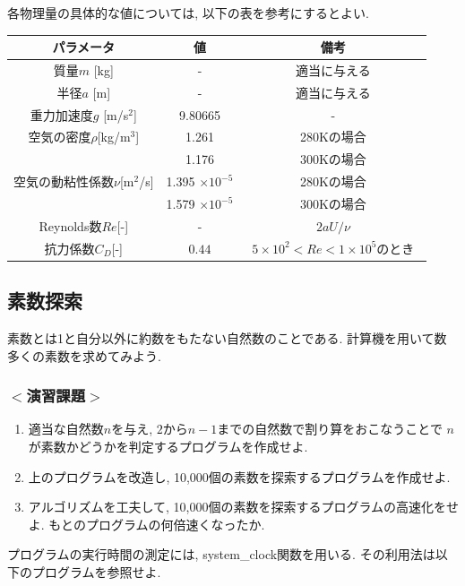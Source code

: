 \documentclass[a4j]{jsarticle}
\begin{document}
各物理量の具体的な値については, 以下の表を参考にするとよい. 
\begin{table}[h]
\centering
\begin{tabular}{ccc}
\hline
パラメータ & 値 & 備考 \\
\hline
質量$m$ [kg] & - & 適当に与える \\ \hline
半径$a$ [m] & - & 適当に与える \\ \hline
重力加速度$g$ [m/s$^2$] & 9.80665 & - \\ \hline
空気の密度$\rho$[kg/m$^3$] & 1.261 & 280Kの場合 \\
 & 1.176 & 300Kの場合 \\ \hline
空気の動粘性係数$\nu$[m$^2$/s] & 1.395 $\times 10^{-5}$ & 280Kの場合 \\
 & 1.579 $\times 10^{-5}$ & 300Kの場合 \\ \hline
Reynolds数$Re$[-] & - & $2aU/\nu$ \\ \hline
抗力係数$C_D$[-] & $0.44$ & $5 \times 10^2 < Re < 1 \times 10^5$のとき　\\ \hline
\end{tabular}
\end{table}



\subsection{素数探索}
素数とは1と自分以外に約数をもたない自然数のことである. 
計算機を用いて数多くの素数を求めてみよう. 

\subsubsection*{$<$演習課題$>$}
\begin{enumerate}
\item 適当な自然数$n$を与え, $2$から$n-1$までの自然数で割り算をおこなうことで
$n$が素数かどうかを判定するプログラムを作成せよ. 
\item 上のプログラムを改造し, 10,000個の素数を探索するプログラムを作成せよ. 
\item アルゴリズムを工夫して, 10,000個の素数を探索するプログラムの高速化をせよ. 
もとのプログラムの何倍速くなったか. 
\end{enumerate}

プログラムの実行時間の測定には, system\_clock関数を用いる. 
その利用法は以下のプログラムを参照せよ. 

\end{document}
